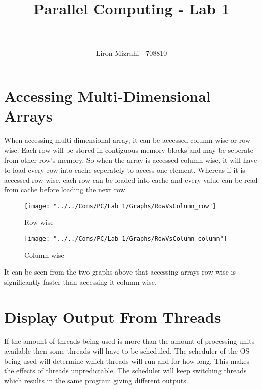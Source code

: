 \documentclass[paper=a4, fontsize=11pt]{scrartcl} %
\title{	
\normalfont \normalsize 
\horrule{0.5pt} \\[0.4cm] %
\huge Parallel Computing - Lab 1 \\ %
\horrule{1pt} \\[0.5cm] %
}
\author{Liron Mizrahi - 708810} %
\numberwithin{equation}{section} %
\numberwithin{figure}{section} %
\numberwithin{table}{section} %
\begin{document}
\maketitle %


\section{Accessing Multi-Dimensional Arrays}

When accessing multi-dimensional array, it can be accessed column-wise or row-wise. Each row will be stored in contiguous memory blocks and may be seperate from other row's memory. So when the array is accessed column-wise, it will have to load every row into cache seperately to access one element. Whereas if it is accessed row-wise, each row can be loaded into cache and every value can be read from cache before loading the next row.

\begin{figure}[!h]
	\centering
	\begin{minipage}[b]{0.4\textwidth}
		\texttt{[image: "../../Coms/PC/Lab 1/Graphs/RowVsColumn\_row"]}
		\caption{Row-wise}
	\end{minipage}
	\hfill
	\begin{minipage}[b]{0.4\textwidth}
		\texttt{[image: "../../Coms/PC/Lab 1/Graphs/RowVsColumn\_column"]}
	\caption{Column-wise}
	\end{minipage}
\end{figure}

It can be seen from the two graphs above that accessing arrays row-wise is significantly faster than accessing it column-wise.


\section{Display Output From Threads}
If the amount of threads being used is more than the amount of processing units available then some threads will have to be scheduled. The scheduler of the OS being used will determine which threads will run and for how long. This makes the effects of threads unpredictable. The scheduler will keep switching threads which results in the same program giving different outputs.
\end{document}
